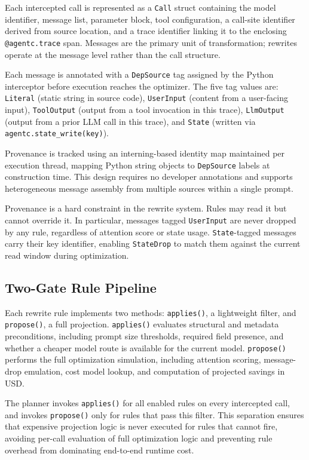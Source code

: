Each intercepted call is represented as a \texttt{Call} struct containing the model
identifier, message list, parameter block, tool configuration, a call-site identifier
derived from source location, and a trace identifier linking it to the enclosing
\texttt{@agentc.trace} span. Messages are the primary unit of transformation; rewrites
operate at the message level rather than the call structure.

Each message is annotated with a \texttt{DepSource} tag assigned by the Python
interceptor before execution reaches the optimizer. The five tag values are:
\texttt{Literal} (static string in source code), \texttt{UserInput} (content from a
user-facing input), \texttt{ToolOutput} (output from a tool invocation in this trace),
\texttt{LlmOutput} (output from a prior LLM call in this trace), and \texttt{State}
(written via \texttt{agentc.state\_write(key)}).

Provenance is tracked using an interning-based identity map maintained per execution
thread, mapping Python string objects to \texttt{DepSource} labels at construction
time. This design requires no developer annotations and supports heterogeneous message
assembly from multiple sources within a single prompt.

Provenance is a hard constraint in the rewrite system. Rules may read it but cannot
override it. In particular, messages tagged \texttt{UserInput} are never dropped by
any rule, regardless of attention score or state usage. \texttt{State}-tagged messages
carry their key identifier, enabling \texttt{StateDrop} to match them against the
current read window during optimization.

\subsection{Two-Gate Rule Pipeline}
\label{sec:twogatepipeline}

Each rewrite rule implements two methods: \texttt{applies()}, a lightweight filter,
and \texttt{propose()}, a full projection. \texttt{applies()} evaluates structural and
metadata preconditions, including prompt size thresholds, required field presence, and
whether a cheaper model route is available for the current model. \texttt{propose()}
performs the full optimization simulation, including attention scoring, message-drop
emulation, cost model lookup, and computation of projected savings in USD.

The planner invokes \texttt{applies()} for all enabled rules on every intercepted
call, and invokes \texttt{propose()} only for rules that pass this filter. This
separation ensures that expensive projection logic is never executed for rules that
cannot fire, avoiding per-call evaluation of full optimization logic and preventing
rule overhead from dominating end-to-end runtime cost.

